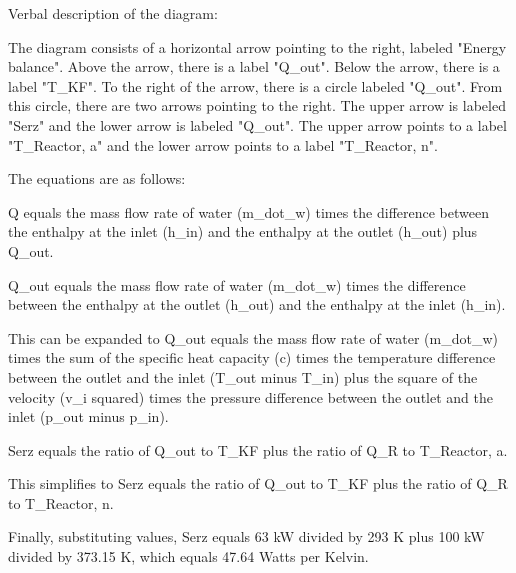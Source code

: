 Verbal description of the diagram:

The diagram consists of a horizontal arrow pointing to the right, labeled "Energy balance". Above the arrow, there is a label "Q_out". Below the arrow, there is a label "T_KF". To the right of the arrow, there is a circle labeled "Q_out". From this circle, there are two arrows pointing to the right. The upper arrow is labeled "Serz" and the lower arrow is labeled "Q_out". The upper arrow points to a label "T_Reactor, a" and the lower arrow points to a label "T_Reactor, n".

The equations are as follows:

Q equals the mass flow rate of water (m_dot_w) times the difference between the enthalpy at the inlet (h_in) and the enthalpy at the outlet (h_out) plus Q_out.

Q_out equals the mass flow rate of water (m_dot_w) times the difference between the enthalpy at the outlet (h_out) and the enthalpy at the inlet (h_in).

This can be expanded to Q_out equals the mass flow rate of water (m_dot_w) times the sum of the specific heat capacity (c) times the temperature difference between the outlet and the inlet (T_out minus T_in) plus the square of the velocity (v_i squared) times the pressure difference between the outlet and the inlet (p_out minus p_in).

Serz equals the ratio of Q_out to T_KF plus the ratio of Q_R to T_Reactor, a.

This simplifies to Serz equals the ratio of Q_out to T_KF plus the ratio of Q_R to T_Reactor, n.

Finally, substituting values, Serz equals 63 kW divided by 293 K plus 100 kW divided by 373.15 K, which equals 47.64 Watts per Kelvin.